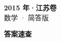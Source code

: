 \documentclass[zihao=-4, a4paper]{ctexart}
\begin{document}
\begin{center}
  {\Large\bfseries 2015 年·江苏卷}\\[4pt]
  {\large 数学 · 简答版}
\end{center}
\medskip
{}

\clearpage
{}
\begin{center}{\Large\bfseries 答案速查}\end{center}
\medskip

\end{document}
